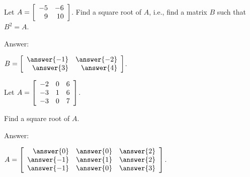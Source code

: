 \documentclass{ximera}
\begin{document}
\begin{example}
  Let $A = \startmat{rr}
    -5 & -6 \\
    9 & 10 \\
  \stopmat$. Find a square root of $A$, i.e., find a matrix $B$
  such that $B^2=A$.
  
  Answer:

  $B=\startmat{rr}
    \answer{-1} & \answer{-2} \\
    \answer{3}  & \answer{4} \\
  \stopmat$.
\end{example}

\begin{example}
  Let $A = \startmat{rrr}
    -2 & 0 & 6 \\
    -3 & 1 & 6 \\
    -3 & 0 & 7 \\
  \stopmat$. 
  
  Find a square root of $A$.
  
  
  Answer:
  
  $A = \startmat{rrr}
    \answer{0}  &  \answer{0} & \answer{2} \\
    \answer{-1} &  \answer{1} & \answer{2} \\
    \answer{-1} &  \answer{0} & \answer{3} \\
  \stopmat$.
\end{example}
\end{document}
